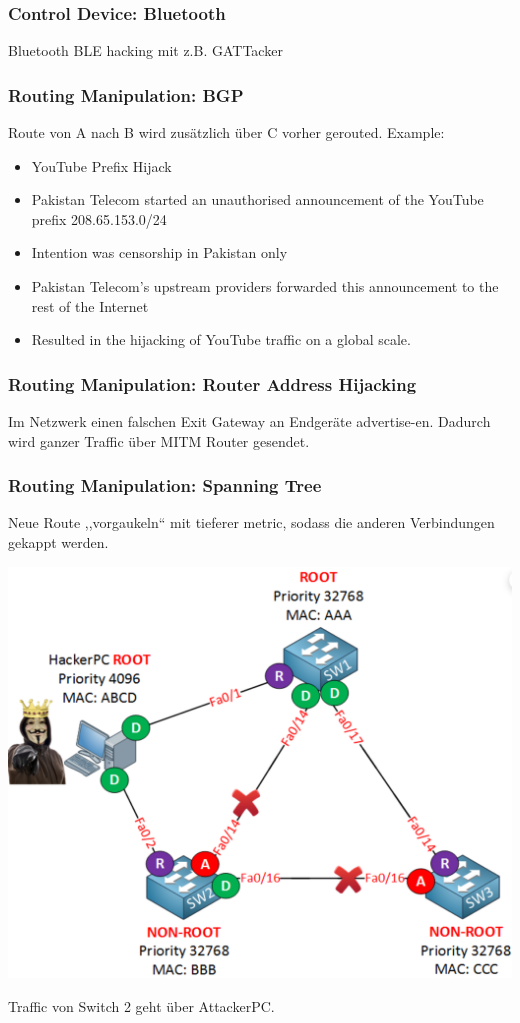 \subsubsection{Control Device: Bluetooth}
Bluetooth BLE hacking mit z.B. GATTacker

\subsubsection{Routing Manipulation: BGP}
Route von A nach B wird zusätzlich über C vorher gerouted. Example:
\begin{itemize}
    \item YouTube Prefix Hijack
    \item Pakistan Telecom started an unauthorised announcement of the YouTube prefix 208.65.153.0/24
    \item Intention was censorship in Pakistan only
    \item Pakistan Telecom's upstream providers forwarded this announcement to the rest of the Internet
    \item Resulted in the hijacking of YouTube traffic on a global scale.
\end{itemize}

\subsubsection{Routing Manipulation: Router Address Hijacking}
Im Netzwerk einen falschen Exit Gateway an Endgeräte advertise-en. Dadurch wird ganzer Traffic über MITM Router gesendet.

\subsubsection{Routing Manipulation: Spanning Tree}
Neue Route ,,vorgaukeln`` mit tieferer metric, sodass die anderen Verbindungen gekappt werden.
\begin{center}
    \vspace{-8pt}
    \includegraphics[width=.6\linewidth]{./img/09-mitm/spanning_tree}
    \vspace{-8pt}
\end{center}
Traffic von Switch 2 geht über AttackerPC.

